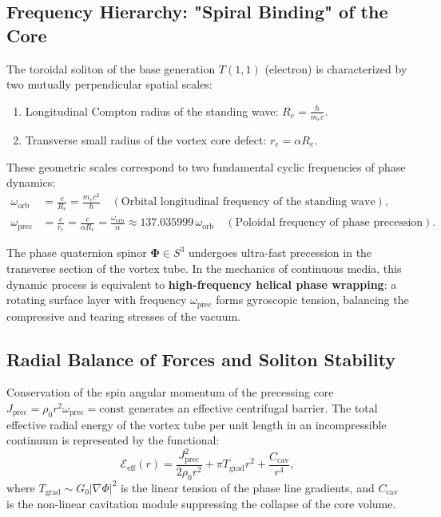 \documentclass[12pt,a4paper]{article}
\begin{document}
	\subsection{Frequency Hierarchy: "Spiral Binding" of the Core}
	The toroidal soliton of the base generation $T(1,1)$ (electron) is characterized by two mutually perpendicular spatial scales:
	\begin{enumerate}
	\item Longitudinal Compton radius of the standing wave: $R_e = \frac{\hbar}{m_e c}$.
	\item Transverse small radius of the vortex core defect: $r_e = \alpha R_e$.
	\end{enumerate}
	
	These geometric scales correspond to two fundamental cyclic frequencies of phase dynamics:
	\begin{align}
	\omega_{\text{orb}} &= \frac{c}{R_e} = \frac{m_e c^2}{\hbar} \quad (\text{Orbital longitudinal frequency of the standing wave}), \\
	\omega_{\text{prec}} &= \frac{c}{r_e} = \frac{c}{\alpha R_e} = \frac{\omega_{\text{orb}}}{\alpha} \approx 137.035999 \, \omega_{\text{orb}} \quad (\text{Poloidal frequency of phase precession}).
	\end{align}
	
	The phase quaternion spinor $\boldsymbol{\Phi} \in S^3$ undergoes ultra-fast precession in the transverse section of the vortex tube. In the mechanics of continuous media, this dynamic process is equivalent to \textbf{high-frequency helical phase wrapping}: a rotating surface layer with frequency $\omega_{\text{prec}}$ forms gyroscopic tension, balancing the compressive and tearing stresses of the vacuum.
	
	\subsection{Radial Balance of Forces and Soliton Stability}
	Conservation of the spin angular momentum of the precessing core $J_{\text{prec}} = \rho_0 r^2 \omega_{\text{prec}} = \text{const}$ generates an effective centrifugal barrier. The total effective radial energy of the vortex tube per unit length in an incompressible continuum is represented by the functional:
	\begin{equation}
	\mathcal{E}_{\text{eff}}(r) = \frac{J_{\text{prec}}^2}{2 \rho_0 r^2} + \pi T_{\text{grad}} r^2 + \frac{C_{\text{cav}}}{r^4},
	\end{equation}
	where $T_{\text{grad}} \sim G_0 |\nabla \Phi|^2$ is the linear tension of the phase line gradients, and $C_{\text{cav}}$ is the non-linear cavitation module suppressing the collapse of the core volume.
	
\end{document}
